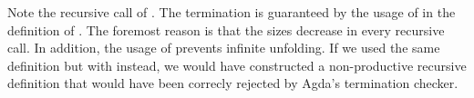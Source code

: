 Note the recursive call of .
The termination is guaranteed by the usage of   in the definition of  .
The foremost reason is that the sizes decrease in every recursive call.
In addition, the usage of  prevents infinite unfolding.
If we used the same definition but with   instead, we would have constructed a non-productive recursive definition that would have been correcly rejected by Agda's termination checker.

\begin{code}%
\>[0]\AgdaSpace{}%
\AgdaSymbol{:}\AgdaSpace{}%
\AgdaSymbol{(}\AgdaSpace{}%
\AgdaSymbol{:}\AgdaSpace{}%
\AgdaSpace{}%
\AgdaSymbol{)}\AgdaSpace{}%
\AgdaSymbol{(}\AgdaSpace{}%
\AgdaSymbol{:}\AgdaSpace{}%
\AgdaSpace{}%
\AgdaSymbol{)}\AgdaSpace{}%
\AgdaSymbol{(}\AgdaSpace{}%
\AgdaSymbol{:}\AgdaSpace{}%
\AgdaSpace{}%
\AgdaSpace{}%
\AgdaSymbol{(}\AgdaSpace{}%
\AgdaSpace{}%
\AgdaSpace{}%
\AgdaSymbol{))}\AgdaSpace{}%
\AgdaSpace{}%
\AgdaSpace{}%
\AgdaSpace{}%
\AgdaSymbol{(}\AgdaSpace{}%
\AgdaSymbol{)}\<%
\\
\>[0]\AgdaSpace{}%
\AgdaSymbol{(}\AgdaSpace{}%
\AgdaSpace{}%
\AgdaSpace{}%
\AgdaSymbol{)}\AgdaSpace{}%
\AgdaSpace{}%
\AgdaSpace{}%
\AgdaSymbol{=}\AgdaSpace{}%
\AgdaSpace{}%
\AgdaSpace{}%
\AgdaSpace{}%
\AgdaSymbol{(}\AgdaSpace{}%
\AgdaSpace{}%
\AgdaSpace{}%
\AgdaSymbol{)}\<%
\end{code}
